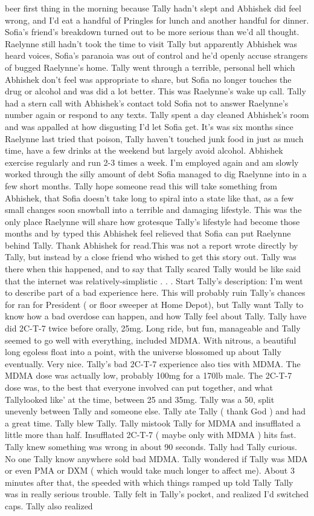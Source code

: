 \documentclass[12pt]{book}
\begin{document}
beer first thing in the morning because Tally hadn't slept and Abhishek did feel wrong, and I'd eat a handful of Pringles for lunch and another handful for dinner. Sofia's friend's breakdown turned out to be more serious than we'd all thought. Raelynne still hadn't took the time to visit Tally but apparently Abhishek was heard voices, Sofia's paranoia was out of control and he'd openly accuse strangers of bugged Raelynne's home. Tally went through a terrible, personal hell which Abhishek don't feel was appropriate to share, but Sofia no longer touches the drug or alcohol and was did a lot better. This was Raelynne's wake up call. Tally had a stern call with Abhishek's contact told Sofia not to answer Raelynne's number again or respond to any texts. Tally spent a day cleaned Abhishek's room and was appalled at how disgusting I'd let Sofia get. It's was six months since Raelynne last tried that poison, Tally haven't touched junk food in just as much time, have a few drinks at the weekend but largely avoid alcohol. Abhishek exercise regularly and run 2-3 times a week. I'm employed again and am slowly worked through the silly amount of debt Sofia managed to dig Raelynne into in a few short months. Tally hope someone read this will take something from Abhishek, that Sofia doesn't take long to spiral into a state like that, as a few small changes soon snowball into a terrible and damaging lifestyle. This was the only place Raelynne will share how grotesque Tally's lifestyle had become those months and by typed this Abhishek feel relieved that Sofia can put Raelynne behind Tally. Thank Abhishek for read.This was not a report wrote directly by Tally, but instead by a close friend who wished to get this story out. Tally was there when this happened, and to say that Tally scared Tally would be like said that the internet was relatively-simplistic . . .  Start Tally's description: I'm went to describe part of a bad experience here. This will probably ruin Tally's chances for ran for President ( or floor sweeper at Home Depot), but Tally want Tally to know how a bad overdose can happen, and how Tally feel about Tally. Tally have did 2C-T-7 twice before orally, 25mg. Long ride, but fun, manageable and Tally seemed to go well with everything, included MDMA. With nitrous, a beautiful long egoless float into a point, with the universe blossomed up about Tally eventually. Very nice. Tally's bad 2C-T-7 experience also ties with MDMA. The MDMA dose was actually low, probably 100mg for a 170lb male. The 2C-T-7 dose was, to the best that everyone involved can put together, and what Tallylooked like' at the time, between 25 and 35mg. Tally was a 50, split unevenly between Tally and someone else. Tally ate Tally ( thank God ) and had a great time. Tally blew Tally. Tally mistook Tally for MDMA and insufflated a little more than half. Insufflated 2C-T-7 ( maybe only with MDMA ) hits fast. Tally knew something was wrong in about 90 seconds. Tally had Tally curious. No one Tally know anywhere sold bad MDMA. Tally wondered if Tally was MDA or even PMA or DXM ( which would take much longer to affect me). About 3 minutes after that, the speeded with which things ramped up told Tally Tally was in really serious trouble. Tally felt in Tally's pocket, and realized I'd switched caps. Tally also realized 
\end{document}
